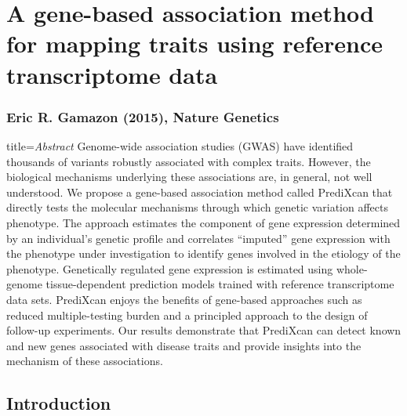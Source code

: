 \documentclass[../main.tex]{subfiles}
\begin{document}
\chapter[A gene-based association method for mapping traits]{A 
	gene-based association method for mapping traits using reference 
	transcriptome data}

\subsection{Eric R. Gamazon \etal (2015), Nature Genetics}

\begin{external_abstract}{title=\textit{Abstract}}
Genome-wide association studies (GWAS) have identified thousands of 
variants robustly associated with complex traits. However, the 
biological mechanisms underlying these associations are, in general, not 
well understood. We propose a gene-based association method called 
PrediXcan that directly tests the molecular mechanisms through which 
genetic variation affects phenotype. The approach estimates the 
component of gene expression determined by an individual's genetic 
profile and correlates \enquote{imputed} gene expression with the 
phenotype under investigation to identify genes involved in the etiology 
of the phenotype. Genetically regulated gene expression is estimated 
using whole-genome tissue-dependent prediction models trained with 
reference transcriptome data sets. PrediXcan enjoys the benefits of 
gene-based approaches such as reduced multiple-testing burden and a 
principled approach to the design of follow-up experiments. Our results 
demonstrate that PrediXcan can detect known and new genes associated 
with disease traits and provide insights into the mechanism of these 
associations.
\end{external_abstract}

\section{Introduction}

\end{document}
